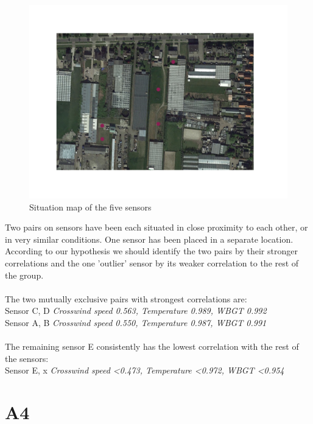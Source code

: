 \documentclass{article}
\begin{document}
\begin{figure}[!htb]
\centering
\includegraphics[width=\textwidth, trim={4cm 6cm 4cm 6cm}, clip]{3-3-map.png}
\caption{Situation map of the five sensors}
\label{fig:3-3}
\end{figure}

Two pairs on sensors have been each situated in close proximity to each other, or in very similar conditions. One sensor has been placed in a separate location. According to our hypothesis we should identify the two pairs by their stronger correlations and the one 'outlier' sensor by its weaker correlation to the rest of the group.
\\
\\The two mutually exclusive pairs with strongest correlations are:
\\ \quad Sensor C, D   \quad   \emph{Crosswind speed 0.563,   Temperature 0.989,   WBGT 0.992}
\\ \quad Sensor A, B   \quad   \emph{Crosswind speed 0.550,   Temperature 0.987,   WBGT 0.991}
\\
\\The remaining sensor E consistently has the lowest correlation with the rest of the sensors:
\\ \quad Sensor E, x   \quad   \emph{Crosswind speed \textless0.473,   Temperature \textless0.972,   WBGT \textless0.954}


\newpage

\section{A4}
\end{document}
